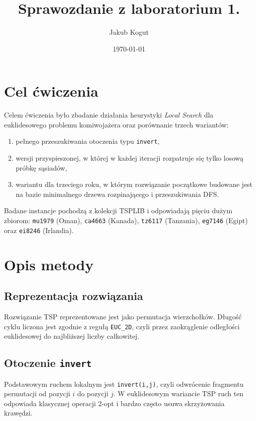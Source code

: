 \documentclass[12pt,a4paper]{article}
\title{Sprawozdanie z laboratorium 1.}
\author{Jakub Kogut}
\date{\today}
\begin{document}
\maketitle

\section{Cel ćwiczenia}
Celem ćwiczenia było zbadanie działania heurystyki \emph{Local Search} dla euklidesowego
problemu komiwojażera oraz porównanie trzech wariantów:
\begin{enumerate}
    \item pełnego przeszukiwania otoczenia typu \texttt{invert},
    \item wersji przyspieszonej, w której w każdej iteracji rozpatruje się tylko losową próbkę
    sąsiadów,
    \item wariantu dla trzeciego roku, w którym rozwiązanie początkowe budowane jest na bazie
    minimalnego drzewa rozpinającego i przeszukiwania DFS.
\end{enumerate}

Badane instancje pochodzą z kolekcji TSPLIB i odpowiadają pięciu dużym zbiorom:
\texttt{mu1979} (Oman), \texttt{ca4663} (Kanada), \texttt{tz6117} (Tanzania),
\texttt{eg7146} (Egipt) oraz \texttt{ei8246} (Irlandia).

\section{Opis metody}
\subsection*{Reprezentacja rozwiązania}
Rozwiązanie TSP reprezentowane jest jako permutacja wierzchołków. Długość cyklu liczona jest
zgodnie z regułą \texttt{EUC\_2D}, czyli przez zaokrąglenie odległości euklidesowej do najbliższej
liczby całkowitej.

\subsection*{Otoczenie \texttt{invert}}
Podstawowym ruchem lokalnym jest \texttt{invert(i,j)}, czyli odwrócenie fragmentu permutacji
od pozycji \(i\) do pozycji \(j\). W euklidesowym wariancie TSP ruch ten odpowiada klasycznej
operacji 2-opt i bardzo często usuwa skrzyżowania krawędzi.
\end{document}
